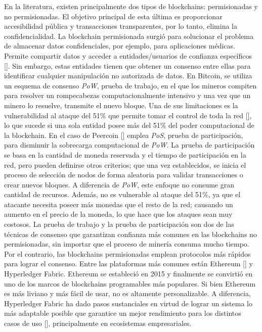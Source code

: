 En la literatura, existen principalmente dos tipos de blockchains: permisionadas y no permisionadas. El objetivo principal de esta \'ultima es proporcionar accesibilidad p\'ublica y transacciones transparentes, por lo tanto, elimina la confidencialidad. La blockchain permisionada surgi\'o para solucionar el problema de almacenar datos confidenciales, por ejemplo, para aplicaciones m\'edicas. Permite compartir datos y acceder a entidades/usuarios de confianza espec\'ificos [\cite{xu2017taxonomy}]. Sin embargo, estas entidades tienen que obtener un consenso entre ellas para identificar cualquier manipulaci\'on no autorizada de datos. En Bitcoin, se utiliza un esquema de consenso \emph{PoW}, prueba de trabajo, en el que los mineros compiten para resolver un rompecabezas computacionalmente intensivo y una vez que un minero lo resuelve, transmite el nuevo bloque. Una de sus limitaciones es la vulnerabilidad al ataque del 51$\%$ que permite tomar el control de toda la red [\cite{narayanan2016bitcoin}], lo que sucede si una sola entidad posee m\'as del 51$\%$ del poder computacional de la blockchain. En el caso de Peercoin [\cite{king2012ppcoin}] emplea \emph{PoS}, prueba de participaci\'on, para disminuir la sobrecarga computacional de \emph{PoW}. La prueba de participaci\'on se basa en la cantidad de moneda reservada y el tiempo de participaci\'on en la red, pero pueden definirse otros criterios; que una vez establecidos, se inicia el proceso de selecci\'on de nodos de forma aleatoria para validar transacciones o crear nuevos bloques. A diferencia de \emph{PoW}, este enfoque no consume gran cantidad de recursos. Adem\'as, no es vulnerable al ataque del 51$\%$, ya que el atacante necesita poseer m\'as monedas que el resto de la red; causando un aumento en el precio de la moneda, lo que hace que los ataques sean muy costosos. La prueba de trabajo y la prueba de participaci\'on son dos de las t\'ecnicas de consenso que garantizan confianza m\'as comunes en las blockchains no permisionadas, sin importar que el proceso de miner\'ia consuma mucho tiempo. Por el contrario, las blockchains permisionadas emplean protocolos m\'as r\'apidos para lograr el consenso. Entre las plataformas m\'as comunes est\'an Ethereum [\cite{antonopoulos2018mastering}] y Hyperledger Fabric. Ethereum se estableci\'o en 2015 y finalmente se convirti\'o en uno de los marcos de blockchains programables m\'as populares. Si bien Ethereum es m\'as liviano y m\'as f\'acil de usar, no es altamente personalizable. A diferencia, Hyperledger Fabric ha dado pasos sustanciales en virtud de lograr un sistema lo m\'as adaptable posible que garantice un mejor rendimiento para los distintos casos de uso [\cite{valenta2017comparison}], principalmente en ecosistemas empresariales.


